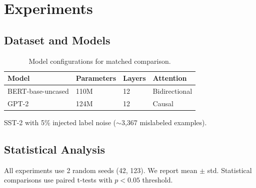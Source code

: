 \section{Experiments}

\subsection{Dataset and Models}

\begin{table}[h]
\centering
\begin{tabular}{llll}
\toprule
Model & Parameters & Layers & Attention \\
\midrule
BERT-base-uncased & 110M & 12 & Bidirectional \\
GPT-2 & 124M & 12 & Causal \\
\bottomrule
\end{tabular}
\caption{Model configurations for matched comparison.}
\label{tab:models}
\end{table}

SST-2 with 5\% injected label noise ($\sim$3,367 mislabeled examples).

\subsection{Statistical Analysis}

All experiments use 2 random seeds (42, 123). We report mean $\pm$ std. Statistical comparisons use paired t-tests with $p<0.05$ threshold.

